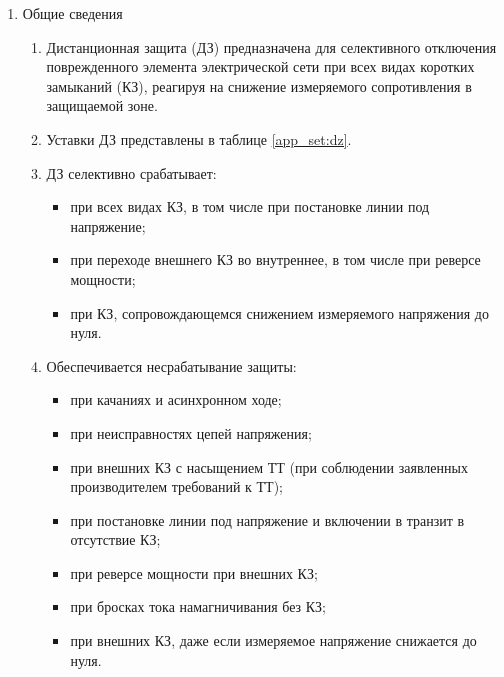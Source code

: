 \color{black}

\begin{enumerate}
\item Общие сведения

\begin{enumerate}

\item
Дистанционная защита (ДЗ) предназначена для селективного отключения поврежденного элемента электрической сети при всех видах коротких замыканий (КЗ), реагируя на снижение измеряемого сопротивления в защищаемой зоне.

\item
Уставки ДЗ представлены в таблице \ref{app_set:dz}.

\item 
ДЗ селективно срабатывает:
\begin{itemize}
  \item при всех видах КЗ, в том числе при постановке линии под напряжение; 
  \item при переходе внешнего КЗ во внутреннее, в том числе при реверсе мощности; 
  \item при КЗ, сопровождающемся снижением измеряемого напряжения до нуля.
\end{itemize}

\item 
Обеспечивается несрабатывание защиты:
\begin{itemize} 
	\item при качаниях и асинхронном ходе; 
	\item при неисправностях цепей напряжения;
	\item при внешних КЗ с насыщением ТТ (при соблюдении заявленных производителем требований к ТТ); 
	\item при постановке линии под напряжение и включении в транзит в отсутствие КЗ;
	\item при реверсе мощности при внешних КЗ; 
	\item при бросках тока намагничивания без КЗ;
	\item при внешних КЗ, даже если измеряемое напряжение снижается до нуля.
\end{itemize}


\end{enumerate}
\end{enumerate}
